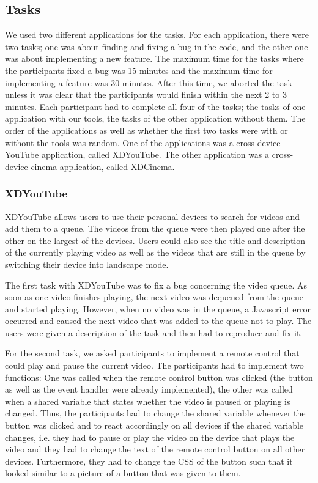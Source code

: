 \subsection{Tasks}

We used two different applications for the tasks. For each application, there were two tasks; one was about finding and fixing a bug in the code, and the other one was about implementing a new feature. The maximum time for the tasks where the participants fixed a bug was 15 minutes and the maximum time for implementing a feature was 30 minutes. After this time, we aborted the task unless it was clear that the participants would finish within the next 2 to 3 minutes. Each participant had to complete all four of the tasks; the tasks of one application with our tools, the tasks of the other application without them. The order of the applications as well as whether the first two tasks were with or without the tools was random. One of the applications was a cross-device YouTube application, called XDYouTube. The other application was a cross-device cinema application, called XDCinema.

\subsubsection{XDYouTube}
XDYouTube allows users to use their personal devices to search for videos and add them to a queue. The videos from the queue were then played one after the other on the largest of the devices. Users could also see the title and description of the currently playing video as well as the videos that are still in the queue by switching their device into landscape mode.

The first task with XDYouTube was to fix a bug concerning the video queue. As soon as one video finishes playing, the next video was dequeued from the queue and started playing. However, when no video was in the queue, a Javascript error occurred and caused the next video that was added to the queue not to play. The users were given a description of the task and then had to reproduce and fix it. 

For the second task, we asked participants to implement a remote control that could play and pause the current video. The participants had to implement two functions: One was called when the remote control button was clicked (the button as well as the event handler were already implemented), the other was called when a shared variable that states whether the video is paused or playing is changed. Thus, the participants had to change the shared variable whenever the button was clicked and to react accordingly on all devices if the shared variable changes, i.e. they had to pause or play the video on the device that plays the video and they had to change the text of the remote control button on all other devices. Furthermore, they had to change the CSS of the button such that it looked similar to a picture of a button that was given to them.

